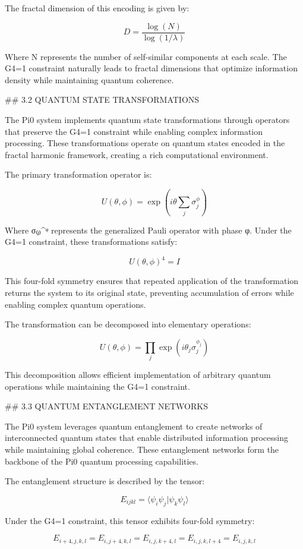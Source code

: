 The fractal dimension of this encoding is given by:

$$D = \frac{\log(N)}{\log(1/\lambda)}$$

Where N represents the number of self-similar components at each scale. The G4=1 constraint naturally leads to fractal dimensions that optimize information density while maintaining quantum coherence.

## 3.2 QUANTUM STATE TRANSFORMATIONS

The Pi0 system implements quantum state transformations through operators that preserve the G4=1 constraint while enabling complex information processing. These transformations operate on quantum states encoded in the fractal harmonic framework, creating a rich computational environment.

The primary transformation operator is:

$$U(\theta, \phi) = \exp\left(i\theta \sum_{j} \sigma_j^{\phi}\right)$$

Where σ₍ⱼ₎^ᵠ represents the generalized Pauli operator with phase φ. Under the G4=1 constraint, these transformations satisfy:

$$U(\theta, \phi)^4 = I$$

This four-fold symmetry ensures that repeated application of the transformation returns the system to its original state, preventing accumulation of errors while enabling complex quantum operations.

The transformation can be decomposed into elementary operations:

$$U(\theta, \phi) = \prod_{j} \exp(i\theta_j \sigma_j^{\phi_j})$$

This decomposition allows efficient implementation of arbitrary quantum operations while maintaining the G4=1 constraint.

## 3.3 QUANTUM ENTANGLEMENT NETWORKS

The Pi0 system leverages quantum entanglement to create networks of interconnected quantum states that enable distributed information processing while maintaining global coherence. These entanglement networks form the backbone of the Pi0 quantum processing capabilities.

The entanglement structure is described by the tensor:

$$E_{ijkl} = \langle \psi_i \psi_j | \psi_k \psi_l \rangle$$

Under the G4=1 constraint, this tensor exhibits four-fold symmetry:

$$E_{i+4,j,k,l} = E_{i,j+4,k,l} = E_{i,j,k+4,l} = E_{i,j,k,l+4} = E_{i,j,k,l}$$

